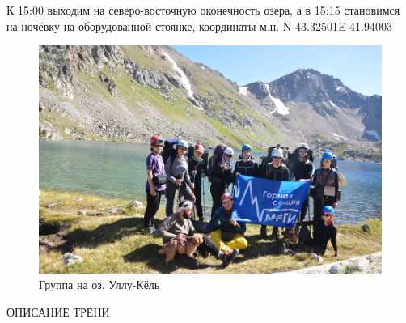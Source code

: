 К 15:00 выходим на северо-восточную оконечность озера, а в 15:15 становимся на ночёвку на оборудованной стоянке, координаты м.н. N 43.32501\degree E 41.94003\degree

\begin{figure}[h!]
	\centering
	\includegraphics[width=0.7\linewidth]{../pics/DSC_0800}
	\caption{Группа на оз. Уллу-Кёль}
	\label{fig:DSC_0800}
\end{figure}



ОПИСАНИЕ ТРЕНИ
\newpage